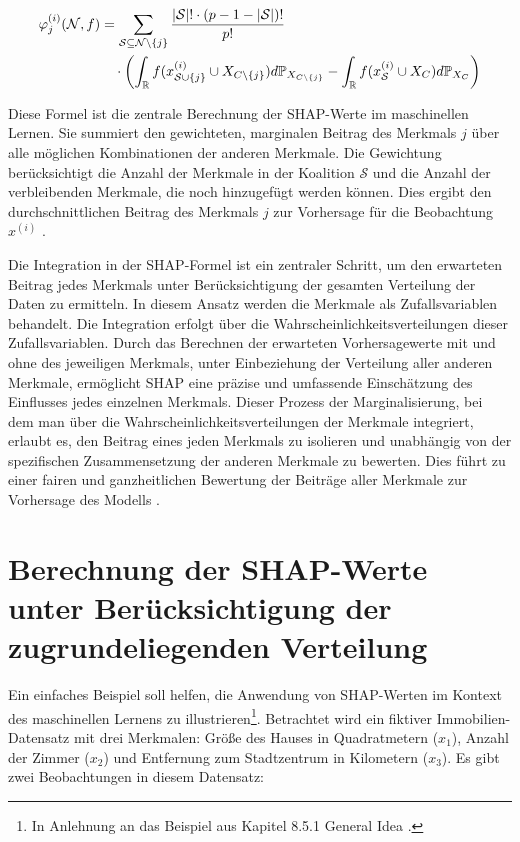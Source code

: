 \begin{align}
    \label{eq:shap-eq}
    \varphi^{(i)}_{j} (\mathcal{N}, f) &= \sum_{\mathcal{S} \subseteq \mathcal{N} \setminus \{j\}} \frac{|\mathcal{S}|! \cdot (p - 1 - |\mathcal{S}|)!}{p!} \\ \notag
    &\quad \cdot \left( \int_{\mathbb{R}} f(x^{(i)}_{\mathcal{S} \cup \{j\}} \cup X_{C \setminus \{j\}}) d\mathbb{P}_{X_{C \setminus \{j\}}} -
    \int_{\mathbb{R}} f(x^{(i)}_{\mathcal{S}} \cup X_{C}) d\mathbb{P}_{X_{C}} \right) 
\end{align}

Diese Formel ist die zentrale Berechnung der SHAP-Werte im maschinellen Lernen. 
Sie summiert den gewichteten, marginalen Beitrag des Merkmals $j$ über alle möglichen Kombinationen der anderen Merkmale. 
Die Gewichtung berücksichtigt die Anzahl der Merkmale in der Koalition $\mathcal{S}$ und die Anzahl der verbleibenden Merkmale, 
die noch hinzugefügt werden können. Dies ergibt den durchschnittlichen Beitrag des Merkmals $j$ zur Vorhersage für die 
Beobachtung $x^{(i)}$ \cite[S. 29, 30]{Molnar_2023}.

Die Integration in der SHAP-Formel ist ein zentraler Schritt, um den erwarteten Beitrag jedes Merkmals unter 
Berücksichtigung der gesamten Verteilung der Daten zu ermitteln. 
In diesem Ansatz werden die Merkmale als Zufallsvariablen behandelt. Die Integration erfolgt über 
die Wahrscheinlichkeitsverteilungen dieser Zufallsvariablen. Durch das Berechnen der erwarteten Vorhersagewerte mit 
und ohne des jeweiligen Merkmals, unter Einbeziehung der Verteilung aller anderen Merkmale, 
ermöglicht SHAP eine präzise und umfassende Einschätzung des Einflusses jedes einzelnen Merkmals. 
Dieser Prozess der Marginalisierung, bei dem man über die Wahrscheinlichkeitsverteilungen der Merkmale integriert, 
erlaubt es, den Beitrag eines jeden Merkmals zu isolieren und unabhängig von der spezifischen Zusammensetzung 
der anderen Merkmale zu bewerten. Dies führt zu einer fairen und ganzheitlichen Bewertung der Beiträge aller Merkmale 
zur Vorhersage des Modells \cite[S. 28]{Molnar_2023}.

\section{Berechnung der SHAP-Werte unter Berücksichtigung der zugrundeliegenden Verteilung}
\label{sec:example}

Ein einfaches Beispiel soll helfen, die Anwendung von SHAP-Werten im 
Kontext des maschinellen Lernens zu illustrieren\footnote{In Anlehnung an das Beispiel aus Kapitel 8.5.1 \glqq{}General Idea\grqq{} \cite[S.215f]{Molnar_2022}.}. Betrachtet wird ein fiktiver 
Immobilien-Datensatz mit drei Merkmalen: Größe des Hauses in Quadratmetern ($x_1$), Anzahl der Zimmer ($x_2$) 
und Entfernung zum Stadtzentrum in Kilometern ($x_3$). Es gibt zwei Beobachtungen in diesem Datensatz:

